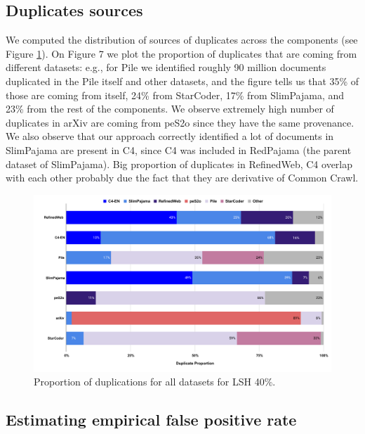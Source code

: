 \documentclass{article}
\begin{document}
\subsection{Duplicates sources}

We computed the distribution of sources of duplicates across the components (see Figure \ref{fig:duplication-proportions}). On Figure 7 we plot the proportion of duplicates that are coming from different datasets: e.g., for Pile we identified roughly 90 million documents duplicated in the Pile itself and other datasets, and the figure tells us that 35\% of those are coming from itself, 24\% from StarCoder, 17\% from SlimPajama, and 23\% from the rest of the components. We observe extremely high number of duplicates in arXiv are coming from peS2o since they have the same provenance. We also observe that our approach correctly identified a lot of documents in SlimPajama are present in C4, since C4 was included in RedPajama (the parent dataset of SlimPajama). Big proportion of duplicates in RefinedWeb, C4 overlap with each other probably due the fact that they are derivative of Common Crawl.

\begin{figure}[!htb]
    \centering
    \includegraphics[width=\textwidth]{figures/chart_dedup_source.pdf}
    \vspace{-0cm}
    \caption{Proportion of duplications for all datasets for LSH 40\%.}
    \label{fig:duplication-proportions}
\end{figure}

\newpage

\subsection{Estimating empirical false positive rate}
\end{document}

